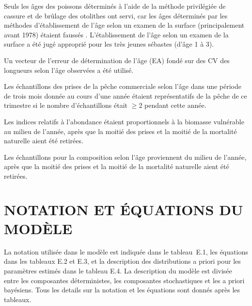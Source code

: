 \documentclass[11pt]{book}
\def\AppLet{E}                   %
\begin{document}
\begin{enumerate_csas}{}{}
\item Seuls les \^{a}ges des poissons d\'{e}termin\'{e}s \`{a} l'aide de la m\'{e}thode privil\'{e}gi\'{e}e de cassure et de br\^{u}lage des otolithes \citep{MacLellan:1997} ont servi, car les \^{a}ges d\'{e}termin\'{e}s par les m\'{e}thodes d'\'{e}tablissement de l'\^{a}ge selon un examen de la surface (principalement avant 1978) \'{e}taient fauss\'{e}s \citep{Beamish:1979}. L'\'{e}tablissement de l'\^{a}ge selon un examen de la surface a \'{e}t\'{e} jug\'{e} appropri\'{e} pour les tr\`{e}s jeunes s\'{e}bastes (d'\^{a}ge 1 \`{a} 3).
\item Un vecteur de l'erreur de d\'{e}termination de l'\^{a}ge (EA) fond\'{e} sur des CV des longueurs selon l'\^{a}ge observ\'{e}es a \'{e}t\'{e} utilis\'{e}.
\item Les \'{e}chantillons des prises de la p\^{e}che commerciale selon l'\^{a}ge dans une p\'{e}riode de trois mois donn\'{e}e au cours d'une ann\'{e}e \'{e}taient repr\'{e}sentatifs de la p\^{e}che de ce trimestre si le nombre d'\'{e}chantillons \'{e}tait $\geq$2 pendant cette ann\'{e}e.
\item Les indices relatifs \`{a} l'abondance \'{e}taient proportionnels \`{a} la biomasse vuln\'{e}rable au milieu de l'ann\'{e}e, apr\`{e}s que la moiti\'{e} des prises et la moiti\'{e} de la mortalit\'{e} naturelle aient \'{e}t\'{e} retir\'{e}es.
\item Les \'{e}chantillons pour la composition selon l'\^{a}ge proviennent du milieu de l'ann\'{e}e, apr\`{e}s que la moiti\'{e} des prises et la moiti\'{e} de la mortalit\'{e} naturelle aient \'{e}t\'{e} retir\'{e}es.
\end{enumerate_csas}

\section{NOTATION ET \'{E}QUATIONS DU MOD\`{E}LE}

La notation utilis\'{e}e dans le mod\`{e}le est indiqu\'{e}e dans le tableau~\AppLet.1, les \'{e}quations dans les tableaux \AppLet.2 et \AppLet.3, et la description des distributions a priori pour les param\`{e}tres estim\'{e}s dans le tableau \AppLet.4. La description du mod\`{e}le est divis\'{e}e entre les composantes d\'{e}terministes, les composantes stochastiques et les a priori bay\'{e}siens. Tous les details sur la notation et les \'{e}quations sont donn\'{e}s apr\`{e}s les tableaux. %
\end{document}
